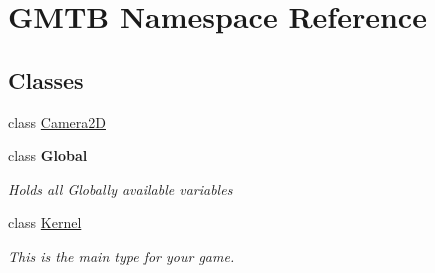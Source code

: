 \hypertarget{namespace_g_m_t_b}{}\section{G\+M\+TB Namespace Reference}
\label{namespace_g_m_t_b}
\subsection*{Classes}
\begin{DoxyCompactItemize}
\item 
class \mbox{\hyperlink{class_g_m_t_b_1_1_camera2_d}{Camera2D}}
\item 
class {\bfseries Global}
\begin{DoxyCompactList}\small\item\em Holds all Globally available variables \end{DoxyCompactList}\item 
class \mbox{\hyperlink{class_g_m_t_b_1_1_kernel}{Kernel}}
\begin{DoxyCompactList}\small\item\em This is the main type for your game. \end{DoxyCompactList}\end{DoxyCompactItemize}
